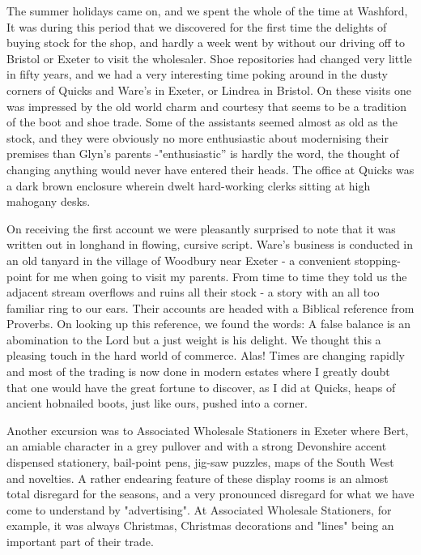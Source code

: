 
The summer holidays came on, and we spent the whole of the time at Washford, It was during this period that we discovered for the first time the delights of buying stock for the shop, and hardly a week went by without our driving off to Bristol or Exeter to visit the wholesaler. Shoe repositories had changed very little in fifty years, and we had a very interesting time poking around in the dusty corners of Quicks and Ware's in Exeter, or Lindrea in Bristol. On these visits one was impressed by the old world charm and courtesy that seems to be a tradition of the boot and shoe trade. Some of the assistants seemed almost as old as the stock, and they were obviously no more enthusiastic about modernising their premises than Glyn's parents -"enthusiastic” is hardly the word, the thought of changing anything would never have entered their heads. The office at Quicks was a dark brown enclosure wherein dwelt hard-working clerks sitting at high mahogany desks.

On receiving the first account we were pleasantly surprised to note that it was written out in longhand in flowing, cursive script. Ware's business is conducted in an old tanyard in the village of Woodbury near Exeter - a convenient stopping-point for me when going to visit my parents. From time to time they told us the adjacent stream overflows and ruins all their stock - a story with an all too familiar ring to our ears. Their accounts are headed with a Biblical reference from Proverbs. On looking up this reference, we found the words: A false balance is an abomination to the Lord but a just weight is his delight. We thought this a pleasing touch in the hard world of commerce. Alas! Times are changing rapidly and most of the trading is now done in modern estates where I greatly doubt that one would have the great fortune to discover, as I did at Quicks, heaps of ancient hobnailed boots, just like ours, pushed into a corner.

Another excursion was to Associated Wholesale Stationers in Exeter where Bert, an amiable character in a grey pullover and with a strong Devonshire accent dispensed stationery, bail-point pens, jig-saw puzzles, maps of the South West and novelties. A rather endearing feature of these display rooms is an almost total disregard for the seasons, and a very pronounced disregard for what we have come to understand by "advertising". At Associated Wholesale Stationers, for example, it was always Christmas, Christmas decorations and "lines" being an important part of their trade.

